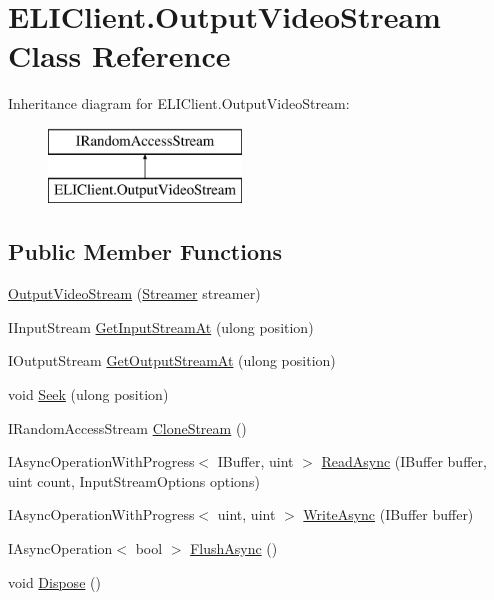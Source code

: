 \hypertarget{class_e_l_i_client_1_1_output_video_stream}{}\section{E\+L\+I\+Client.\+Output\+Video\+Stream Class Reference}
\label{class_e_l_i_client_1_1_output_video_stream}
Inheritance diagram for E\+L\+I\+Client.\+Output\+Video\+Stream\+:\begin{figure}[H]
\begin{center}
\leavevmode
\includegraphics[height=2.000000cm]{d6/dfe/class_e_l_i_client_1_1_output_video_stream}
\end{center}
\end{figure}
\subsection*{Public Member Functions}
\begin{DoxyCompactItemize}
\item 
\hyperlink{class_e_l_i_client_1_1_output_video_stream_ae53199f9aa8b56940a0d89b0de41b993}{Output\+Video\+Stream} (\hyperlink{class_e_l_i_client_1_1_streamer}{Streamer} streamer)
\item 
I\+Input\+Stream \hyperlink{class_e_l_i_client_1_1_output_video_stream_acaa44180e28619cb0a44a6c9d3caaca7}{Get\+Input\+Stream\+At} (ulong position)
\item 
I\+Output\+Stream \hyperlink{class_e_l_i_client_1_1_output_video_stream_ac9c25492413eb9187e11f45ac8652efe}{Get\+Output\+Stream\+At} (ulong position)
\item 
void \hyperlink{class_e_l_i_client_1_1_output_video_stream_a0c808f0f0fa8388008e25cb54f174cc6}{Seek} (ulong position)
\item 
I\+Random\+Access\+Stream \hyperlink{class_e_l_i_client_1_1_output_video_stream_a544fbf37edb556ccfef29090878c270b}{Clone\+Stream} ()
\item 
I\+Async\+Operation\+With\+Progress$<$ I\+Buffer, uint $>$ \hyperlink{class_e_l_i_client_1_1_output_video_stream_aa42ec5fa6c418ad002df0b937a3b8144}{Read\+Async} (I\+Buffer buffer, uint count, Input\+Stream\+Options options)
\item 
I\+Async\+Operation\+With\+Progress$<$ uint, uint $>$ \hyperlink{class_e_l_i_client_1_1_output_video_stream_a0345385c6f8607b3a84120c6d714adbc}{Write\+Async} (I\+Buffer buffer)
\item 
I\+Async\+Operation$<$ bool $>$ \hyperlink{class_e_l_i_client_1_1_output_video_stream_a350e9d190aa34a202f13c2260f2a7412}{Flush\+Async} ()
\item 
void \hyperlink{class_e_l_i_client_1_1_output_video_stream_aadc11fccbe0f1e962a50fa406b750935}{Dispose} ()
\end{DoxyCompactItemize}
